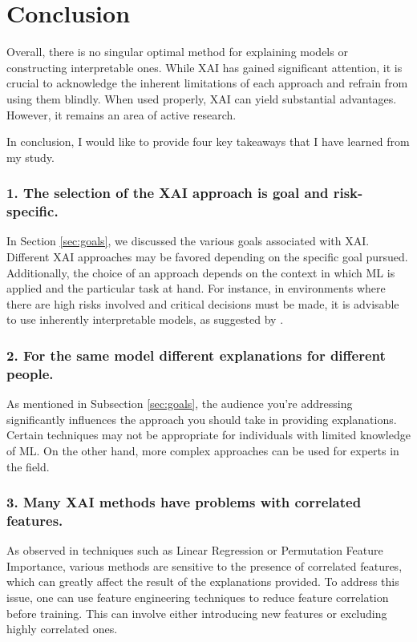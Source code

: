 
\newpage
\section{Conclusion}\label{sec:6}

Overall, there is no singular optimal method for explaining models or constructing interpretable ones. While XAI has gained significant attention, it is crucial to acknowledge the inherent limitations of each approach and refrain from using them blindly. When used properly, XAI can yield substantial advantages. However, it remains an area of active research.

In conclusion, I would like to provide four key takeaways that I have learned from my study.

\subsubsection*{1. The selection of the XAI approach is goal and risk-specific.}
In Section \ref{sec:goals}, we discussed the various goals associated with XAI. Different XAI approaches may be favored depending on the specific goal pursued. \\
Additionally, the choice of an approach depends on the context in which ML is applied and the particular task at hand. For instance, in environments where there are high risks involved and critical decisions must be made, it is advisable to use inherently interpretable models, as suggested by \cite{rudin2019stop}.

\subsubsection*{2. For the same model different explanations for different people.}
As mentioned in Subsection \ref{sec:goals}, the audience you're addressing significantly influences the approach you should take in providing explanations. Certain techniques may not be appropriate for individuals with limited knowledge of ML. On the other hand, more complex approaches can be used for experts in the field.

\subsubsection*{3. Many XAI methods have problems with correlated features.}
As observed in techniques such as Linear Regression or Permutation Feature Importance, various methods are sensitive to the presence of correlated features, which can greatly affect the result of the explanations provided.
To address this issue, one can use feature engineering techniques to reduce feature correlation before training. This can involve either introducing new features or excluding highly correlated ones.

